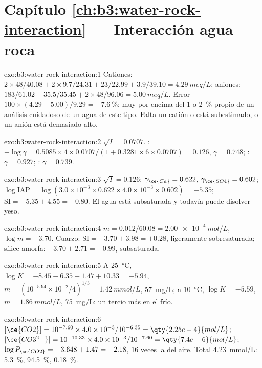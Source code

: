 \section*{Capítulo \ref{ch:b3:water-rock-interaction} --- Interacción agua--roca}

\begin{solution}{exo:b3:water-rock-interaction:1}
Cationes: $2\times48/40.08 + 2\times9.7/24.31 + 23/22.99 + 3.9/39.10 =
\qty{4.29}{meq/L}$; aniones: $183/61.02 + 35.5/35.45 + 2\times48/96.06 =
\qty{5.00}{meq/L}$. Error $100\times(4.29 - 5.00)/9.29 = \qty{-7.6}{\percent}$:
muy por encima del 1 o \qty{2}{\percent} propio de un análisis cuidadoso de un agua de este tipo.
Falta un catión o está subestimado, o un anión está demasiado alto.
\end{solution}

\begin{solution}{exo:b3:water-rock-interaction:2}
$\sqrt I = 0.0707$. : $-\log\gamma = 0.5085\times4\times0.0707/(1 +
0.3281\times6\times0.0707) = 0.126$, $\gamma = 0.748$; : $\gamma =
0.927$; : $\gamma = 0.739$.
\end{solution}

\begin{solution}{exo:b3:water-rock-interaction:3}
$\sqrt I = 0.126$; $\gamma_{\ce{Ca}} = 0.622$, $\gamma_{\ce{SO4}} = 0.602$;
$\log\mathrm{IAP} = \log(3.0\times10^{-3}\times0.622\times4.0\times10^{-3}
\times0.602) = -5.35$; $\mathrm{SI} = -5.35 + 4.55 = -0.80$. El agua está
subsaturada y todavía puede disolver yeso.
\end{solution}

\begin{solution}{exo:b3:water-rock-interaction:4}
$m = 0.012/60.08 = \qty{2.00e-4}{mol/L}$, $\log m = -3.70$. Cuarzo:
$\mathrm{SI} = -3.70 + 3.98 = +0.28$, ligeramente sobresaturada; sílice
amorfa: $-3.70 + 2.71 = -0.99$, subsaturada.
\end{solution}

\begin{solution}{exo:b3:water-rock-interaction:5}
A \qty{25}{\celsius}, $\log K = -8.45 - 6.35 - 1.47 + 10.33 = -5.94$, $m =
(10^{-5.94}\times10^{-2}/4)^{1/3} = \qty{1.42}{mmol/L}$, \qty{57}{mg/L}; a
\qty{10}{\celsius}, $\log K = -5.59$, $m = \qty{1.86}{mmol/L}$,
\qty{75}{mg/L}: un tercio más en el frío.
\end{solution}

\begin{solution}{exo:b3:water-rock-interaction:6}
$[\ce{CO2}] = 10^{-7.60}\times4.0\times10^{-3}/10^{-6.35} =
\qty{2.25e-4}{mol/L}$; $[\ce{CO3^2-}] = 10^{-10.33}\times4.0\times10^{-3}/
10^{-7.60} = \qty{7.4e-6}{mol/L}$; $\log P_{\ce{CO2}} = -3.648 + 1.47 =
-2.18$, 16 veces la del aire. Total \qty{4.23}{mmol/L}: 
\qty{5.3}{\percent},  \qty{94.5}{\percent}, 
\qty{0.18}{\percent}.
\end{solution}

